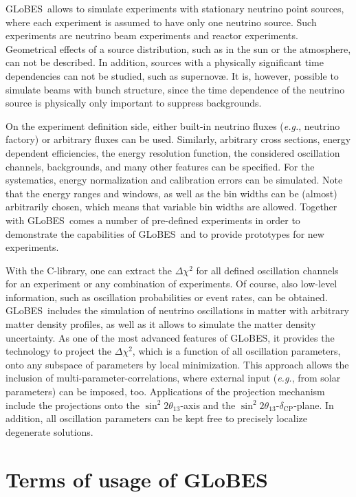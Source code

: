 \documentclass[a4paper,12pt,twoside]{book}
\newcommand{\deltacp}{\delta_{\mathrm{CP}}}
\newcommand{\stheta}{\sin^2 2 \theta_{13}}
\newcommand{\eg}{{\it e.g.}}
\newcommand{\GLOBES}{{\sf GLoBES}}
\begin{document}
\GLOBES\ allows to simulate experiments with stationary neutrino point sources, where each experiment is assumed to have only one neutrino source.
Such experiments are neutrino beam experiments and reactor experiments. 
Geometrical effects of a source distribution, such as in the sun or the 
atmosphere, can not be described. In addition, sources with a physically 
significant time dependencies  can not be studied, such as  supernov\ae. It 
is, however, possible to simulate beams with bunch structure, since the 
time dependence of the neutrino source is physically only important to suppress backgrounds. 

On the experiment definition side, either built-in neutrino fluxes
(\eg, neutrino factory) or arbitrary fluxes can be used. Similarly,
arbitrary cross sections, energy dependent efficiencies, the
energy resolution function, the considered oscillation channels, 
backgrounds, and many other features can be specified. 
For the systematics, energy
normalization and calibration errors can be simulated. Note that
the energy ranges and windows, as well as the bin widths can be
(almost) arbitrarily chosen, which means that variable bin
widths are allowed. Together with \GLOBES\ comes a number of
pre-defined experiments in order to demonstrate the capabilities
of \GLOBES\ and to provide prototypes for new experiments.

With the C-library, one can extract the $\Delta \chi^2$ for all defined 
oscillation channels for an experiment or any combination of experiments.
Of course, also low-level information, such as oscillation
probabilities or event rates, can be obtained. \GLOBES\ includes the
simulation of neutrino oscillations in matter with arbitrary matter 
density profiles, as well as it allows to simulate the matter density
uncertainty. As one of the most
advanced features of \GLOBES , it provides the technology to 
project the $\Delta \chi^2$, which is a function of all oscillation
parameters, onto any subspace of parameters by local minimization. 
This approach allows the inclusion of multi-parameter-correlations,
where external input (\eg, from solar parameters) can be imposed, too.
Applications of the projection mechanism include the projections onto the $\stheta$-axis and the $\stheta$-$\deltacp$-plane. In addition, all oscillation parameters can be kept free to precisely localize 
degenerate solutions.

\chapter*{Terms of usage of \GLOBES}
\end{document}

